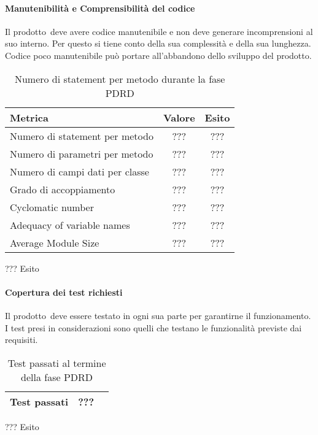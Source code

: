 \documentclass[../PianoDiQualifica.tex]{subfiles}
\begin{document}
\begin{appendices}
			\paragraph{Manutenibilità e Comprensibilità del codice}
				Il prodotto\g\ deve avere codice manutenibile e non deve generare incomprensioni al suo interno. Per questo si tiene conto della sua complessità e della sua lunghezza. Codice poco manutenibile può portare all'abbandono dello sviluppo del prodotto\g.
			\begin{table}[H]
				\centering
				\begin{tabular}{l * {2}{c}}
					\toprule
					\textbf{Metrica} & \textbf{Valore} & \textbf{Esito} \\
					\midrule
					Numero di statement per metodo & ??? & ??? \\
					Numero di parametri per metodo & ??? & ??? \\
					Numero di campi dati per classe & ??? & ??? \\
					Grado di accoppiamento & ??? & ??? \\
					Cyclomatic number & ??? & ??? \\
					Adequacy of variable names & ??? & ??? \\
					Average Module Size & ??? & ??? \\
					\midrule
				\end{tabular}
				\caption{Numero di statement per metodo durante la fase PDRD}
				\label{tab:numero_statement_metodo}
			\end{table}
			
			??? Esito
			
			\paragraph{Copertura dei test richiesti}
				Il prodotto\g\ deve essere testato in ogni sua parte per garantirne il funzionamento. I test presi in considerazioni sono quelli che testano le funzionalità previste dai requisiti.
			\begin{table}[H]
				\centering
				\begin{tabular}{l * {2}{c}}
					\midrule
					Test passati & ??? \\
					\midrule
				\end{tabular}
				\caption{Test passati al termine della fase PDRD}
				\label{tab:copertura_test}
			\end{table}
			
			??? Esito
			

\end{appendices}
\end{document}
